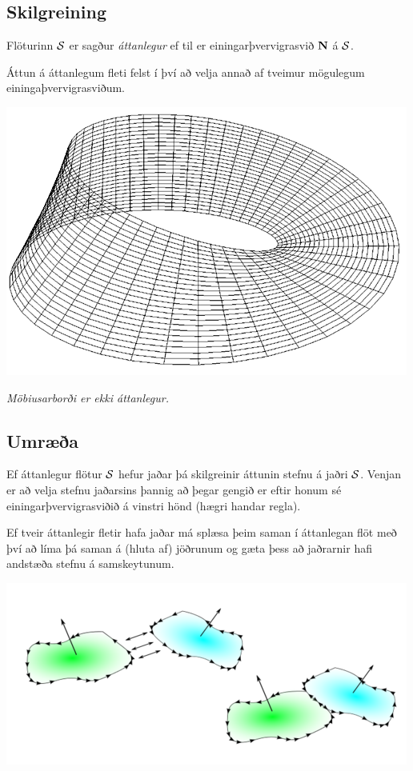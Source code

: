 \documentclass[a4paper,10pt,icelandic]{sphinxmanual}
\begin{document}
\subsection{Skilgreining}
\label{Kafli5:id24}
Flöturinn \(\cal S\) er sagður \emph{áttanlegur} ef til er
einingarþvervigrasvið \(\mbox{${\bf N}$}\) á \(\cal S\).

Áttun á áttanlegum fleti felst í því að velja annað af tveimur mögulegum
einingaþvervigrasviðum.

{\hfill\includegraphics[width=0.400\linewidth]{mobius.png}\hfill}

\emph{Möbiusarborði er ekki áttanlegur.}


\subsection{Umræða}
\label{Kafli5:umraea}
Ef áttanlegur flötur \(\cal S\) hefur jaðar þá skilgreinir áttunin
stefnu á jaðri \(\cal S\). Venjan er að velja stefnu jaðarsins
þannig að þegar gengið er eftir honum sé einingarþvervigrasviðið á
vinstri hönd (hægri handar regla).

Ef tveir áttanlegir fletir hafa jaðar má splæsa þeim saman í áttanlegan
flöt með því að líma þá saman á (hluta af) jöðrunum og gæta þess að
jaðrarnir hafi andstæða stefnu á samskeytunum.

{\hfill\includegraphics[width=0.700\linewidth]{joinsurf.png}\hfill}
\end{document}
